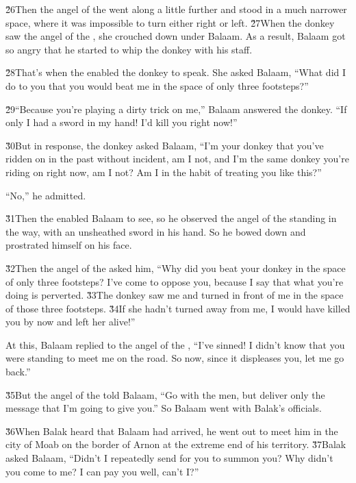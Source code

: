 \v{26}Then the angel of the  went along a little further and stood in a much narrower space, where it was impossible to turn either right or left. \v{27}When the donkey saw the angel of the , she crouched down under Balaam. As a result, Balaam got so angry that he started to whip the donkey with his staff.

\v{28}That's when the  enabled the donkey to speak. She asked Balaam, ``What did I do to you that you would beat me in the space of only three footsteps?''

\v{29}``Because you're playing a dirty trick on me,'' Balaam answered the donkey. ``If only I had a sword in my hand! I'd kill you right now!''

\v{30}But in response, the donkey asked Balaam, ``I'm your donkey that you've ridden on in the past without incident, am I not, and I'm the same donkey you're riding on right now, am I not? Am I in the habit of treating you like this?''

``No,'' he admitted.

\v{31}Then the  enabled Balaam to see, so he observed the angel of the  standing in the way, with an unsheathed sword in his hand. So he bowed down and prostrated himself on his face.

\v{32}Then the angel of the  asked him, ``Why did you beat your donkey in the space of only three footsteps? I've come to oppose you, because I say that what you're doing is perverted. \v{33}The donkey saw me and turned in front of me in the space of those three footsteps. \v{34}If she hadn't turned away from me, I would have killed you by now and left her alive!''

At this, Balaam replied to the angel of the , ``I've sinned! I didn't know that you were standing to meet me on the road. So now, since it displeases you, let me go back.''

\v{35}But the angel of the  told Balaam, ``Go with the men, but deliver only the message that I'm going to give you.'' So Balaam went with Balak's officials.

\v{36}When Balak heard that Balaam had arrived, he went out to meet him in the city of Moab on the border of Arnon at the extreme end of his territory. \v{37}Balak asked Balaam, ``Didn't I repeatedly send for you to summon you? Why didn't you come to me? I can pay you well, can't I?''

